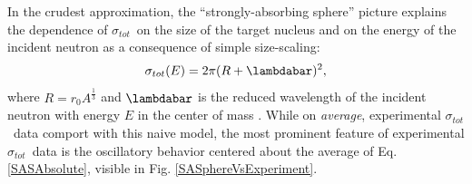 \documentclass[twocolumn,secnumarabic,amssymb, nobibnotes, aps, prl,
superscriptaddress, nobalancelastpage]{revtex4}
\newcommand{\tot}{\ensuremath{\sigma_{tot}}}
\newcommand{\totRD}{\ensuremath{\sigma_{A,A'}}(E)}
\begin{document}
In the crudest approximation, the ``strongly-absorbing sphere'' picture
explains the dependence of \tot\ on the size of the target nucleus and on the
energy of the incident neutron as a consequence of simple size-scaling:
\begin{equation} \label{SASAbsolute}
    \sigma_{tot}(E) = 2\pi(R + \lambdabar)^{2},
\end{equation}
where $R=r_{0}A^{\frac{1}{3}}$ and $\lambdabar$ is the reduced wavelength
of the incident neutron with energy $E$ in the center of mass \cite{Fernbach1949, Satchler1980}. 
While on \textit{average}, experimental \tot\ data comport with this naive
model, the most prominent feature of experimental \tot\ data is the oscillatory
behavior centered about the average of Eq. \ref{SASAbsolute}, visible in Fig.
\ref{SASphereVsExperiment}.
\end{document}
